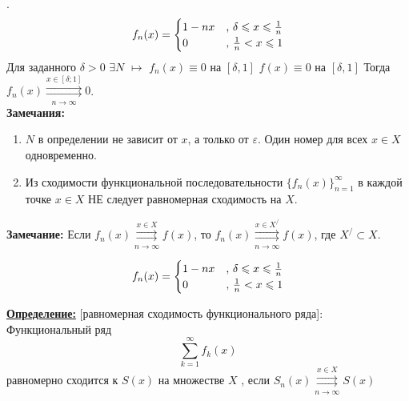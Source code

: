 \documentclass[a4paper,12pt]{article} %
\renewcommand {\leq}{\leqslant}
\begin{document}
.\\

\begin{equation*}
f_n(x) = 
 \begin{cases}
   1-nx &\text{, $\delta \leq x \leq {1 \over n}$}\\
   0 &\text{, ${1\over n}< x\leq 1$}
 \end{cases}
\end{equation*}
Для заданного $\delta > 0$ $\exists N$ $\longmapsto$ \newline
\hspace*{40 mm} $f_n(x) \equiv 0$ на $[\delta, 1]$ \newline
\hspace*{40 mm} $f(x) \equiv 0$ на $[\delta, 1]$ \newline
Тогда $f_n(x) \overset{x \in [\delta;1]}{\underset{n \rightarrow \infty}{\rightrightarrows}} 0$.\\


\textbf{Замечания:}\newline

\begin{enumerate}
    \item $N$ в определении не зависит от $x$, а только от $\varepsilon$. Один номер для всех $x \in X$ одновременно.
    
    \item Из сходимости функциональной последовательности $\{f_n(x)\}_{n=1}^\infty$ в каждой точке $x \in X$ НЕ следует равномерная сходимость на $X$.
   
\end{enumerate}

\textbf{Замечание:} Если $f_n(x) \overset{x \in X}{\underset{n \rightarrow \infty}{\rightrightarrows}} f(x)$, то 
$f_n(x) \overset{x \in X^/}{\underset{n \rightarrow \infty}{\rightrightarrows}} f(x)$, где $X^/ \subset X$.

\begin{equation*}
f_n(x) = 
 \begin{cases}
   1-nx &\text{, $\delta \leq x \leq {1 \over n}$}\\
   0 &\text{, ${1\over n}< x\leq 1$}
 \end{cases}
\end{equation*}

\underline{\textbf{Определение:}} [равномерная сходимость функционального ряда]:\newline 
Функциональный ряд $$\sum\limits_{k = 1}^{\infty}  f_k(x)$$ равномерно сходится к $S(x)$ на множестве $X$ , если $S_n(x) \overset{x \in X}{\underset{n \rightarrow \infty}{\rightrightarrows}} S(x)$
\end{document}
